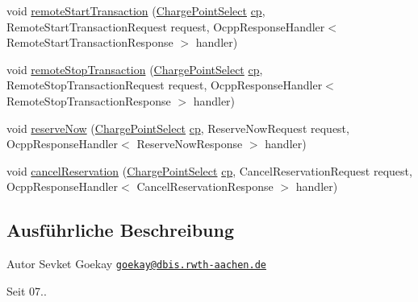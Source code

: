 \begin{DoxyCompactItemize}
\item 
void \hyperlink{classde_1_1rwth_1_1idsg_1_1steve_1_1service_1_1_charge_point_service15___dispatcher_a5667bf41f0a6c3e677322377b16dc0a0}{remote\-Start\-Transaction} (\hyperlink{classde_1_1rwth_1_1idsg_1_1steve_1_1repository_1_1dto_1_1_charge_point_select}{Charge\-Point\-Select} \hyperlink{get_transaction_ids_8js_a02fb69feb56940fd46d72ea6a60e511f}{cp}, Remote\-Start\-Transaction\-Request request, Ocpp\-Response\-Handler$<$ Remote\-Start\-Transaction\-Response $>$ handler)
\item 
void \hyperlink{classde_1_1rwth_1_1idsg_1_1steve_1_1service_1_1_charge_point_service15___dispatcher_a200f857a13ee5fdea3d81fd0634e6dd2}{remote\-Stop\-Transaction} (\hyperlink{classde_1_1rwth_1_1idsg_1_1steve_1_1repository_1_1dto_1_1_charge_point_select}{Charge\-Point\-Select} \hyperlink{get_transaction_ids_8js_a02fb69feb56940fd46d72ea6a60e511f}{cp}, Remote\-Stop\-Transaction\-Request request, Ocpp\-Response\-Handler$<$ Remote\-Stop\-Transaction\-Response $>$ handler)
\item 
void \hyperlink{classde_1_1rwth_1_1idsg_1_1steve_1_1service_1_1_charge_point_service15___dispatcher_a3dc3e949c70d5148b1543bf4fed11579}{reserve\-Now} (\hyperlink{classde_1_1rwth_1_1idsg_1_1steve_1_1repository_1_1dto_1_1_charge_point_select}{Charge\-Point\-Select} \hyperlink{get_transaction_ids_8js_a02fb69feb56940fd46d72ea6a60e511f}{cp}, Reserve\-Now\-Request request, Ocpp\-Response\-Handler$<$ Reserve\-Now\-Response $>$ handler)
\item 
void \hyperlink{classde_1_1rwth_1_1idsg_1_1steve_1_1service_1_1_charge_point_service15___dispatcher_a95e09e473419ae5ea15cffbcc6ff0701}{cancel\-Reservation} (\hyperlink{classde_1_1rwth_1_1idsg_1_1steve_1_1repository_1_1dto_1_1_charge_point_select}{Charge\-Point\-Select} \hyperlink{get_transaction_ids_8js_a02fb69feb56940fd46d72ea6a60e511f}{cp}, Cancel\-Reservation\-Request request, Ocpp\-Response\-Handler$<$ Cancel\-Reservation\-Response $>$ handler)
\end{DoxyCompactItemize}


\subsection{Ausführliche Beschreibung}
\begin{DoxyAuthor}{Autor}
Sevket Goekay \href{mailto:goekay@dbis.rwth-aachen.de}{\tt goekay@dbis.\-rwth-\/aachen.\-de} 
\end{DoxyAuthor}
\begin{DoxySince}{Seit}
07.. 
\end{DoxySince}


